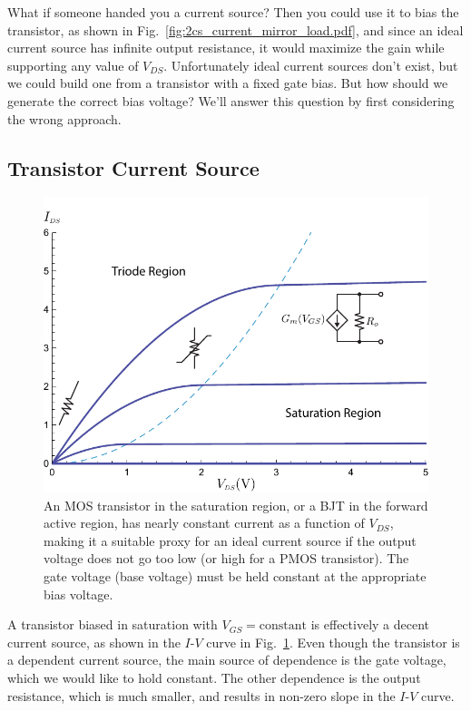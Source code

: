 What if someone handed you a current source?  Then you could use it to bias the transistor, as shown in Fig.~\ref{fig:2cs_current_mirror_load.pdf}, and since an ideal current source has infinite output resistance, it would maximize the gain while supporting any value of $V_{DS}$.  Unfortunately ideal current sources don't exist, but we could build one from a transistor with a fixed gate bias.  But how should we generate the correct bias voltage?  We'll answer this question by first considering the wrong approach.
 



\subsection{Transistor Current Source}

\begin{figure}[tb]
\begin{center}
\includegraphics[width=.75\columnwidth]{mos_building_block.pdf}
\end{center}
\caption{An MOS transistor in the saturation region, or a BJT in the forward active region, has nearly constant current as a function of $V_{DS}$, making it a suitable proxy for an ideal current source if the output voltage does not go too low (or high for a PMOS transistor).  The gate voltage (base voltage) must be held constant at the appropriate bias voltage.} \label{fig:mos_building_block.pdf}
\end{figure}

A transistor biased in saturation with $V_{GS} = \text{constant}$ is effectively a decent current source, as shown in the $I$-$V$ curve in Fig.~\ref{fig:mos_building_block.pdf}.  Even though the transistor is a dependent current source, the main source of dependence is the gate voltage, which we would like to hold constant.  The other dependence is the output resistance, which is much smaller, and results in non-zero slope in the $I$-$V$ curve. 
 

